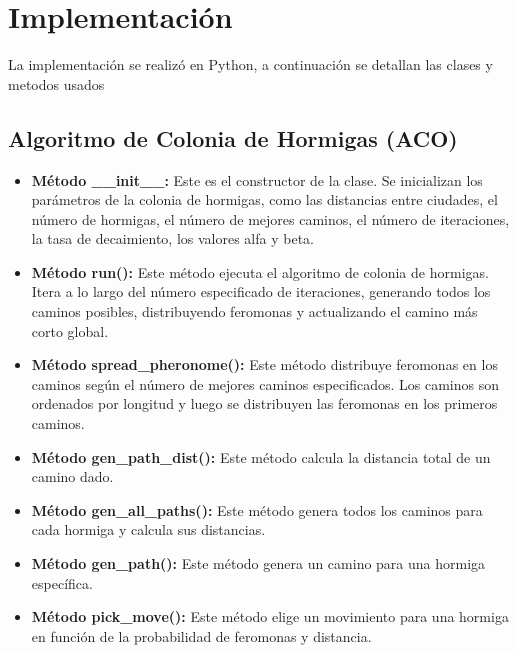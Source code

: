 \documentclass[]{report}
\begin{document}
	\section{Implementación}
	La implementación se realizó en Python, a continuación se detallan las clases y metodos usados
		
	\subsection{Algoritmo de Colonia de Hormigas (ACO)}
	\begin{itemize}
		\item \textbf{Método \_\_init\_\_:} Este es el constructor de la clase. Se inicializan los parámetros de la colonia de hormigas, como las distancias entre ciudades, el número de hormigas, el número de mejores caminos, el número de iteraciones, la tasa de decaimiento, los valores alfa y beta.
		\item \textbf{Método run():} Este método ejecuta el algoritmo de colonia de hormigas. Itera a lo largo del número especificado de iteraciones, generando todos los caminos posibles, distribuyendo feromonas y actualizando el camino más corto global.
		\item \textbf{Método spread\_pheronome():} Este método distribuye feromonas en los caminos según el número de mejores caminos especificados. Los caminos son ordenados por longitud y luego se distribuyen las feromonas en los primeros caminos.
		\item \textbf{Método gen\_path\_dist():} Este método calcula la distancia total de un camino dado.
		\item \textbf{Método gen\_all\_paths():} Este método genera todos los caminos para cada hormiga y calcula sus distancias.
		\item \textbf{Método gen\_path():} Este método genera un camino para una hormiga específica.
		\item \textbf{Método pick\_move():} Este método elige un movimiento para una hormiga en función de la probabilidad de feromonas y distancia.
	\end{itemize}
\end{document}
